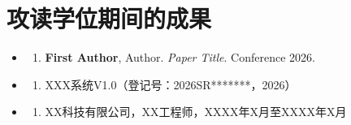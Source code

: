 \clearpage
{}
\chapter*{攻读学位期间的成果}

\begin{itemize}
	\setlength{\parsep}{2em}
	\item \textbf{\heiti{}}
	      \begin{enumerate}
		      \item \textbf{First Author}, Author. \emph{Paper Title}. Conference 2026.
	      \end{enumerate}

	\item \textbf{\heiti{}}
	      \begin{enumerate}
		      \item XXX系统V1.0（登记号：2026SR*******，2026）
	      \end{enumerate}

	\item \textbf{\heiti{}}
	      \begin{enumerate}
		      \item XX科技有限公司，XX工程师，XXXX年X月至XXXX年X月
	      \end{enumerate}

\end{itemize}
